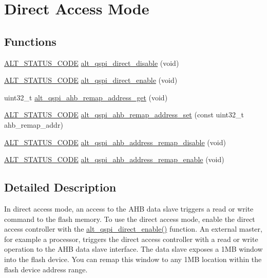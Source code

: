 \hypertarget{group__ALT__QSPI__DAC}{}\section{Direct Access Mode}
\label{group__ALT__QSPI__DAC}
\subsection*{Functions}
\begin{DoxyCompactItemize}
\item 
\mbox{\hyperlink{hwlib_8h_abdb0d369f069723ca55d6c94bcaaaa12}{A\+L\+T\+\_\+\+S\+T\+A\+T\+U\+S\+\_\+\+C\+O\+DE}} \mbox{\hyperlink{group__ALT__QSPI__DAC_ga87c0f59732f55d34b21cb53a26e385c2}{alt\+\_\+qspi\+\_\+direct\+\_\+disable}} (void)
\item 
\mbox{\hyperlink{hwlib_8h_abdb0d369f069723ca55d6c94bcaaaa12}{A\+L\+T\+\_\+\+S\+T\+A\+T\+U\+S\+\_\+\+C\+O\+DE}} \mbox{\hyperlink{group__ALT__QSPI__DAC_gae37eb1b5749d99e70b9cbb59aa02abe3}{alt\+\_\+qspi\+\_\+direct\+\_\+enable}} (void)
\item 
uint32\+\_\+t \mbox{\hyperlink{group__ALT__QSPI__DAC_ga37e95f1b1aba211cf942a9db0ca46073}{alt\+\_\+qspi\+\_\+ahb\+\_\+remap\+\_\+address\+\_\+get}} (void)
\item 
\mbox{\hyperlink{hwlib_8h_abdb0d369f069723ca55d6c94bcaaaa12}{A\+L\+T\+\_\+\+S\+T\+A\+T\+U\+S\+\_\+\+C\+O\+DE}} \mbox{\hyperlink{group__ALT__QSPI__DAC_gad7b0dc3a61560e7d7c2edeb9204698ad}{alt\+\_\+qspi\+\_\+ahb\+\_\+remap\+\_\+address\+\_\+set}} (const uint32\+\_\+t ahb\+\_\+remap\+\_\+addr)
\item 
\mbox{\hyperlink{hwlib_8h_abdb0d369f069723ca55d6c94bcaaaa12}{A\+L\+T\+\_\+\+S\+T\+A\+T\+U\+S\+\_\+\+C\+O\+DE}} \mbox{\hyperlink{group__ALT__QSPI__DAC_ga7df90b3cb6c7074554eaf324b72a3b00}{alt\+\_\+qspi\+\_\+ahb\+\_\+address\+\_\+remap\+\_\+disable}} (void)
\item 
\mbox{\hyperlink{hwlib_8h_abdb0d369f069723ca55d6c94bcaaaa12}{A\+L\+T\+\_\+\+S\+T\+A\+T\+U\+S\+\_\+\+C\+O\+DE}} \mbox{\hyperlink{group__ALT__QSPI__DAC_ga0663558383dd05011ee908f98acbf0b0}{alt\+\_\+qspi\+\_\+ahb\+\_\+address\+\_\+remap\+\_\+enable}} (void)
\end{DoxyCompactItemize}


\subsection{Detailed Description}
In direct access mode, an access to the A\+HB data slave triggers a read or write command to the flash memory. To use the direct access mode, enable the direct access controller with the \mbox{\hyperlink{group__ALT__QSPI__DAC_gae37eb1b5749d99e70b9cbb59aa02abe3}{alt\+\_\+qspi\+\_\+direct\+\_\+enable()}} function. An external master, for example a processor, triggers the direct access controller with a read or write operation to the A\+HB data slave interface. The data slave exposes a 1MB window into the flash device. You can remap this window to any 1MB location within the flash device address range.

